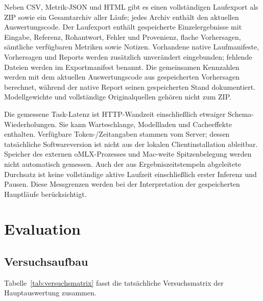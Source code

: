 \documentclass[12pt,twoside=false,a4paper,parskip]{scrbook}
\begin{document}
Neben CSV, Metrik-JSON und HTML gibt es einen vollständigen Laufexport als ZIP sowie ein Gesamtarchiv aller Läufe; jedes Archiv enthält den aktuellen Auswertungscode. Der Laufexport enthält gespeicherte Einzelergebnisse mit Eingabe, Referenz, Rohantwort, Fehler und Provenienz, flache Vorhersagen, sämtliche verfügbaren Metriken sowie Notizen. Vorhandene native Laufmanifeste, Vorhersagen und Reports werden zusätzlich unverändert eingebunden; fehlende Dateien werden im Exportmanifest benannt. Die gemeinsamen Kennzahlen werden mit dem aktuellen Auswertungscode aus gespeicherten Vorhersagen berechnet, während der native Report seinen gespeicherten Stand dokumentiert. Modellgewichte und vollständige Originalquellen gehören nicht zum ZIP.

Die gemessene Task-Latenz ist HTTP-Wandzeit einschließlich etwaiger Schema-Wiederholungen. Sie kann Warteschlange, Modellladen und Cacheeffekte enthalten. Verfügbare Token-/Zeitangaben stammen vom Server; dessen tatsächliche Softwareversion ist nicht aus der lokalen Clientinstallation ableitbar. Speicher des externen oMLX-Prozesses und Mac-weite Spitzenbelegung werden nicht automatisch gemessen. Auch der aus Ergebniszeitstempeln abgeleitete Durchsatz ist keine vollständige aktive Laufzeit einschließlich erster Inferenz und Pausen. Diese Messgrenzen werden bei der Interpretation der gespeicherten Hauptläufe berücksichtigt.

\chapter{Evaluation}\label{ch:evaluation}

\section{Versuchsaufbau}\label{sec:versuchsaufbau}

Tabelle~\ref{tab:versuchsmatrix} fasst die tatsächliche Versuchsmatrix der Hauptauswertung zusammen.
\end{document}
